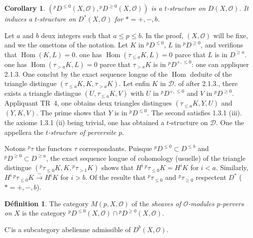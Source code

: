 \documentclass[12pt,a4paper]{article}
\theoremstyle{plain}
\newtheorem{corollary}[theorem]{Corollary}
\theoremstyle{definition}
\newtheorem{definition}[theorem]{D\'efinition}
\DeclareMathOperator{\Hom}{Hom}
\begin{document}
\begin{corollary}\label{cor:2.1.4}
$({}^p D^{\leqslant 0}(X, \mathcal{O}), {}^p D^{\geqslant 0}(X, \mathcal{O}))$ is a $t$-structure on $D(X, \mathcal{O})$. It induces a $t$-structure on $D^*(X, \mathcal{O})$ for $* = +, -, b$.
\end{corollary}

Let $a$ and $b$ deux integers such that $a \leqslant p \leqslant b$. In the proof, $(X, \mathcal{O})$ will be fixe, and we the omettons of the notation. Let $K$ in ${}^p D^{\leqslant 0}$, $L$ in ${}^p D^{\geqslant 0}$, and verifions that $\Hom(K,L) = 0$. one has $\Hom(\tau_{\leqslant a} K, L) = 0$ parce that $L$ is in $D^{\geqslant a}$. one has $\Hom(\tau_{> a} K, L) = 0$ parce that $\tau_{> a} K$ is in ${}^p D^{+, \leqslant 0}$: one can appliquer 2.1.3. One conclut by the exact sequence longue of the $\Hom$ deduite of the triangle distingue $(\tau_{\leqslant a} K, K, \tau_{> a} K)$. Let enfin $K$ in $\mathcal{D}$. of after 2.1.3., there exists a triangle distingue $(U, \tau_{\leqslant a} K, V)$ with $U$ in ${}^p D^{+, \leqslant 0}$ and $V$ in ${}^p D^{\geqslant 0}$. Appliquant TR~4, one obtains deux triangles distingues $(\tau_{\leqslant a} K, Y, U)$ and $(Y, K, V)$. The prime shows that $Y$ is in ${}^p D^{\leqslant 0}$. The second satisfies 1.3.1 (iii). the axiome 1.3.1 (ii) being trivial, one has obtained a $t$-structure on $\mathcal{D}$. One the appellera the \emph{$t$-structure of perversite $p$}.

Notons ${}^p \tau$ the functors $\tau$ correspondants. Puisque ${}^p D^{\leqslant 0} \subset D^{\leqslant b}$ and ${}^p D^{\geqslant 0} \subset D^{\geqslant a}$, the exact sequence longue of cohomology (usuelle) of the triangle distingue $({}^p \tau_{\leqslant 0} K, K, {}^p \tau_{> 1} K)$ shows that $H^i \, {}^p \tau_{\leqslant 0} K = H^i K$ for $i < a$. Similarly, $H^i \, {}^p \tau_{\leqslant 0} K \xrightarrow{\;\sim\;} H^i K$ for $i > b$. Of the resulte that ${}^p \tau_{\leqslant 0}$ and ${}^p \tau_{\geqslant 0}$ respectent $D^*$ ($* = +, -, b$).

\begin{definition}\label{def:2.1.5}
The category $M(p, X, \mathcal{O})$ of the \emph{sheaves of $\mathcal{O}$-modules $p$-pervers on $X$} is the category ${}^p D^{\leqslant 0}(X, \mathcal{O}) \cap {}^p D^{\geqslant 0}(X, \mathcal{O})$.
\end{definition}

C'is a subcategory abelienne admissible of $D^b(X, \mathcal{O})$.
\end{document}
